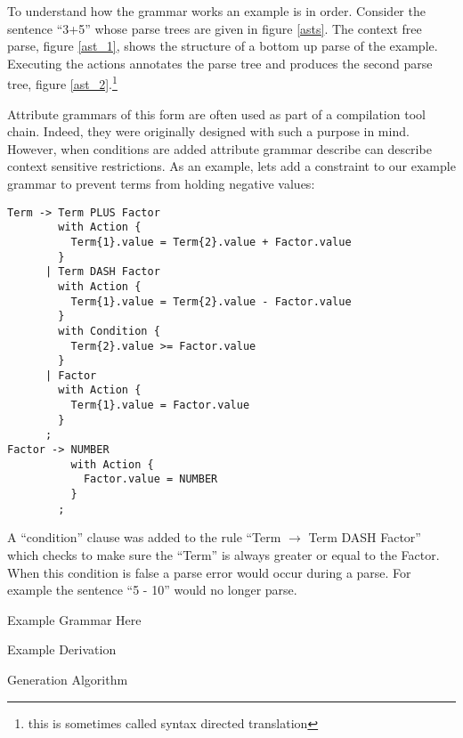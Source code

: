 To understand how the grammar works an example is in order. Consider the
sentence ``3+5'' whose parse trees are given in figure \ref{asts}. The context
free parse, figure \ref{ast_1}, shows the structure of a bottom up parse of the
example. Executing the actions annotates the parse tree and produces the second
parse tree, figure \ref{ast_2}.\footnote{this is sometimes called syntax
directed translation} 

Attribute grammars of this form are often used as part of a compilation tool
chain. Indeed, they were originally designed with such a purpose in mind.
However, when conditions are added attribute grammar describe can describe
context sensitive restrictions.\cite{Slonneger1995} As an example, lets add a
constraint to our example grammar to prevent terms from holding negative values:

\begin{verbatim}
Term -> Term PLUS Factor
        with Action {
          Term{1}.value = Term{2}.value + Factor.value
        }
      | Term DASH Factor
        with Action {
          Term{1}.value = Term{2}.value - Factor.value
        }
        with Condition {
          Term{2}.value >= Factor.value
        }
      | Factor
        with Action {
          Term{1}.value = Factor.value
        }
      ;
Factor -> NUMBER 
          with Action {
            Factor.value = NUMBER
          }
        ;
\end{verbatim}

\noindent
A ``condition'' clause was added to the rule ``Term $\rightarrow$ Term DASH
Factor'' which checks to make sure the ``Term'' is always greater or equal to
the Factor. When this condition is false a parse error would occur during a
parse. For example the sentence ``5 - 10'' would no longer parse.



Example Grammar Here

Example Derivation

Generation Algorithm


